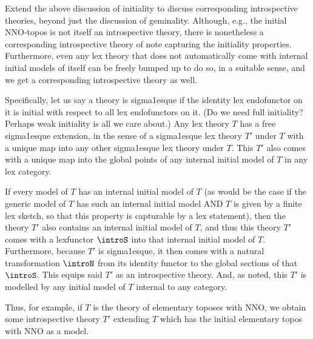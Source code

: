 \begin{TODOblock}
Extend the above discussion of initiality to discuss corresponding introspective theories, beyond just the discussion of geminality. Although, e.g., the initial NNO-topos is not itself an introspective theory, there is nonetheless a corresponding introspective theory of note capturing the initiality properties. Furthermore, even any lex theory that does not automatically come with internal initial models of itself can be freely bumped up to do so, in a suitable sense, and we get a corresponding introspective theory as well.

Specifically, let us say a theory is sigma1esque if the identity lex endofunctor on it is initial with respect to all lex endofunctors on it. (Do we need full initiality? Perhaps weak initiality is all we care about.) Any lex theory $T$ has a free sigma1esque extension, in the sense of a sigma1esque lex theory $T'$ under $T$ with a unique map into any other sigma1esque lex theory under $T$. This $T'$ also comes with a unique map into the global points of any internal initial model of $T$ in any lex category.

If every model of $T$ has an internal initial model of $T$ (as would be the case if the generic model of $T$ has such an internal initial model AND $T$ is given by a finite lex sketch, so that this property is capturable by a lex statement), then the theory $T'$ also contains an internal initial model of $T$, and thus this theory $T'$ comes with a lexfunctor $\introS$ into that internal initial model of $T$. Furthermore, because $T'$ is sigma1esque, it then comes with a natural transformation $\introN$ from its identity functor to the global sections of that $\introS$. This equips said $T'$ as an introspective theory. And, as noted, this $T'$ is modelled by any initial model of $T$ internal to any category.

Thus, for example, if $T$ is the theory of elementary toposes with NNO, we obtain some introspective theory $T'$ extending $T$ which has the initial elementary topos with NNO as a model.
\end{TODOblock}

